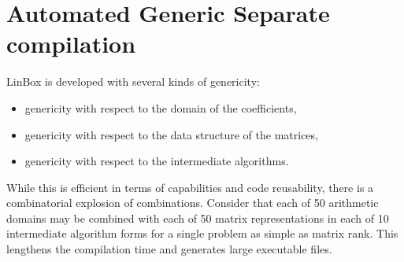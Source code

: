 \documentclass{article}
\newcommand{\linbox}{{\sc LinBox}\xspace}
\begin{document}
\section{Automated Generic Separate compilation}\label{sec:sepcomp}
\linbox is developed with several kinds of genericity:
\begin{itemize}
\item 
genericity with respect to the domain of the coefficients,
\item 
genericity with respect to the data structure of the matrices,
\item 
genericity with respect to the intermediate algorithms.
\end{itemize}
While this is efficient in terms of capabilities and code reusability, there is a combinatorial explosion of combinations.  Consider that each of 50 arithmetic domains may be combined with each of 50 matrix representations in each of 10 intermediate algorithm forms for a single problem as simple as matrix rank. This
lengthens the compilation time and generates large executable files.
\end{document}
